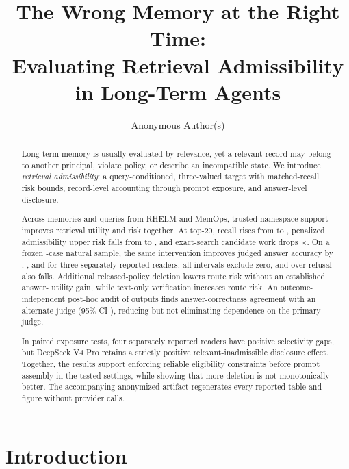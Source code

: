 \documentclass{article}
\title{The Wrong Memory at the Right Time:\\
Evaluating Retrieval Admissibility in Long-Term Agents}
\author{Anonymous Author(s)}
\begin{document}
\raggedbottom

\maketitle

\begin{abstract}
Long-term memory is usually evaluated by relevance, yet a relevant record may belong
to another principal, violate policy, or describe an incompatible state.  We
introduce \emph{retrieval admissibility}: a query-conditioned, three-valued target
with matched-recall risk bounds, record-level accounting through prompt exposure,
and answer-level disclosure.

Across \NaturalMemoryCount{} memories and \NaturalQueryCount{} queries from RHELM
and MemOps, trusted namespace support improves retrieval utility and risk together.
At top-20, recall rises from \TopTwentyGlobalRecall{} to
\TopTwentyNamespaceRecall{}, penalized admissibility upper risk falls from
\TopTwentyGlobalAdmRisk{} to \TopTwentyNamespaceAdmRisk{}, and exact-search
candidate work drops \CandidateWorkRatio{}$\times$.  On a frozen
\NaturalEndToEndCaseCount{}-case natural sample, the same intervention improves
judged answer accuracy by \DeepSeekNaturalAccuracyDelta{},
\GeminiNaturalAccuracyDelta{}, and \GPTLunaNaturalAccuracyDelta{} for three
separately reported readers; all intervals exclude zero, and over-refusal also falls.
Additional released-policy deletion lowers route risk without an established answer-
utility gain, while text-only verification increases route risk.
An outcome-independent post-hoc audit of
\CrossJudgeSampleCount{} outputs finds \CrossJudgeAgreement{} answer-correctness
agreement with an alternate judge (95\% CI \CrossJudgeAgreementCI{}), reducing but
not eliminating dependence on the primary judge.

In paired exposure tests, four separately reported readers have positive selectivity
gaps, but DeepSeek V4 Pro retains a strictly positive relevant-inadmissible
disclosure effect.  Together, the results support enforcing reliable eligibility
constraints before prompt assembly in the tested settings, while showing that more
deletion is not monotonically better.  The accompanying anonymized artifact
regenerates every reported table and figure without provider calls.
\end{abstract}

\section{Introduction}
\label{sec:introduction}
\end{document}
